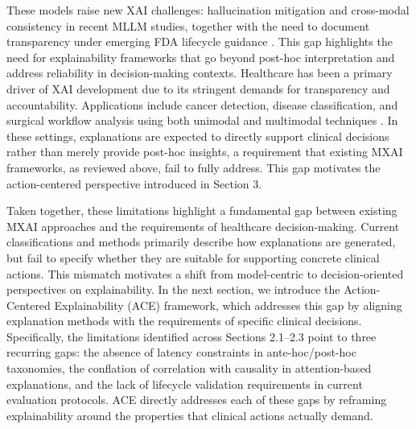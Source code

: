 \documentclass[pdflatex,sn-mathphys-num]{sn-jnl}%
\theoremstyle{thmstyleone}%
\theoremstyle{thmstyletwo}%
\theoremstyle{thmstylethree}%
\begin{document}
These models raise new XAI challenges: hallucination mitigation and cross-modal consistency in recent MLLM studies, together with the need to document transparency under emerging FDA lifecycle guidance \cite{pal2024geminigoesmedschool,chu2025reducinghallucinationsmedicalmultimodal,fda2025draft}.
This gap highlights the need for explainability frameworks that go beyond post-hoc interpretation and address reliability in decision-making contexts.
Healthcare has been a primary driver of XAI development due to its stringent demands for transparency and accountability. Applications include cancer detection, disease classification, and surgical workflow analysis using both unimodal and multimodal techniques \cite{SADEGHI2024109370,Mohan_2025}. In these settings, explanations are expected to directly support clinical decisions rather than merely provide post-hoc insights, a requirement that existing MXAI frameworks, as reviewed above, fail to fully address. This gap motivates the action-centered perspective introduced in Section 3.

Taken together, these limitations highlight a fundamental gap between existing MXAI approaches and the requirements of healthcare decision-making. Current classifications and methods primarily describe how explanations are generated, but fail to specify whether they are suitable for supporting concrete clinical actions. This mismatch motivates a shift from model-centric to decision-oriented perspectives on explainability. 
In the next section, we introduce the Action-Centered Explainability (ACE) framework, which addresses this gap by aligning explanation methods with the requirements of specific clinical decisions.
Specifically, the limitations identified across Sections 2.1–2.3 point to three recurring gaps: the absence of latency constraints in ante-hoc/post-hoc taxonomies, the conflation of correlation with causality in attention-based explanations, and the lack of lifecycle validation requirements in current evaluation protocols. ACE directly addresses each of these gaps by reframing explainability around the properties that clinical actions actually demand.
\end{document}
